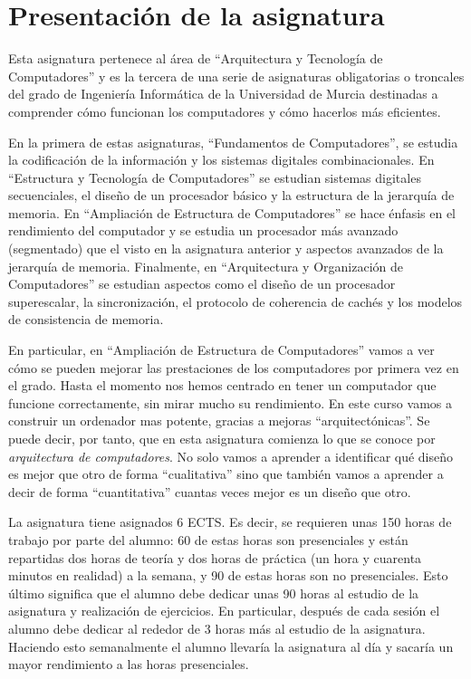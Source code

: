 \documentclass[12pt,onecolumn]{memoir}
\begin{document}
\setcounter{chapter}{-1}

\def\figurename{Figura}
\def\tablename{Tabla}
\def\chaptername{Tema}

\chapter{Presentación de la asignatura}
\label{cap:presentacion}

Esta asignatura pertenece al área de ``Arquitectura y Tecnología de
Computadores'' y es la tercera de una serie de asignaturas
obligatorias o troncales del grado de Ingeniería Informática de la
Universidad de Murcia destinadas a comprender cómo funcionan los
computadores y cómo hacerlos más eficientes.

En la primera de estas asignaturas, ``Fundamentos de Computadores'',
se estudia la codificación de la información y los sistemas digitales
combinacionales. En ``Estructura y Tecnología de Computadores'' se
estudian sistemas digitales secuenciales, el diseño de un procesador
básico y la estructura de la jerarquía de memoria. En ``Ampliación de
Estructura de Computadores'' se hace énfasis en el rendimiento del
computador y se estudia un procesador más avanzado (segmentado) que el
visto en la asignatura anterior y aspectos avanzados de la jerarquía
de memoria. Finalmente, en ``Arquitectura y Organización de
Computadores'' se estudian aspectos como el diseño de un procesador
superescalar, la sincronización, el protocolo de coherencia de cachés
y los modelos de consistencia de memoria.

En particular, en ``Ampliación de Estructura de Computadores'' vamos a
ver cómo se pueden mejorar las prestaciones de los computadores por
primera vez en el grado. Hasta el momento nos hemos centrado en tener
un computador que funcione correctamente, sin mirar mucho su
rendimiento. En este curso vamos a construir un ordenador mas potente,
gracias a mejoras ``arquitectónicas''. Se puede decir, por tanto, que
en esta asignatura comienza lo que se conoce por \emph{arquitectura de
  computadores}. No solo vamos a aprender a identificar qué diseño es
mejor que otro de forma ``cualitativa'' sino que también vamos a
aprender a decir de forma ``cuantitativa'' cuantas veces mejor es un
diseño que otro.

La asignatura tiene asignados 6 ECTS. Es decir, se requieren unas 150
horas de trabajo por parte del alumno: 60 de estas horas son
presenciales y están repartidas dos horas de teoría y dos horas de
práctica (un hora y cuarenta minutos en realidad) a la semana, y 90 de
estas horas son no presenciales. Esto último significa que el alumno
debe dedicar unas 90 horas al estudio de la asignatura y realización
de ejercicios. En particular, después de cada sesión el alumno debe
dedicar al rededor de 3 horas más al estudio de la
asignatura. Haciendo esto semanalmente el alumno llevaría la
asignatura al día y sacaría un mayor rendimiento a las horas
presenciales.
\end{document}
